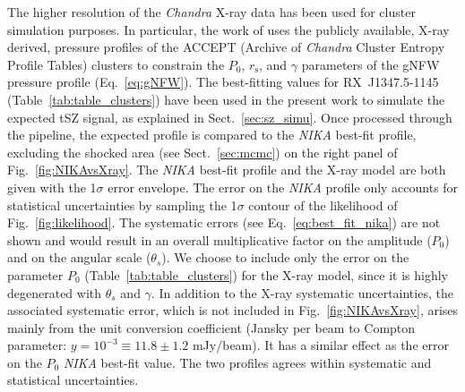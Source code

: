 The higher resolution of the {\it Chandra} \mbox{X-ray} data has been used for cluster simulation purposes. In particular, the work of \cite{Barbara} uses the publicly available, \mbox{X-ray} derived, pressure profiles of the ACCEPT (Archive of {\it Chandra} Cluster Entropy Profile Tables) clusters \citep{Cavagnolo2009} to constrain the $P_0 $, $r_{\mathrm{s}}$, and $\gamma$ parameters of the gNFW pressure profile (Eq.~\ref{eq:gNFW}). The best-fitting values for \mbox{RX~J1347.5-1145} (Table~\ref{tab:table_clusters}) have been used in the present work to simulate the expected tSZ signal, as explained in Sect.~\ref{sec:sz_simu}. Once processed through the pipeline, the expected profile is compared to the {\it NIKA} best-fit profile, excluding the shocked area (see Sect.~\ref{sec:mcmc}) on the right panel of Fig.~\ref{fig:NIKAvsXray}. The {\it NIKA} best-fit profile and the \mbox{X-ray} model are both given with the 1$\sigma$ error envelope. The error on the {\it NIKA} profile only accounts for statistical uncertainties by sampling the 1$\sigma$ contour of the likelihood of Fig.~\ref{fig:likelihood}. The systematic errors (see Eq.~\ref{eq:best_fit_nika}) are not shown and would result in an overall multiplicative factor on the amplitude ($P_0$) and on the angular scale ($\theta_s$). We choose to include only the error on the parameter $P_0$ (Table~\ref{tab:table_clusters}) for the \mbox{X-ray} model, since it is highly degenerated with $\theta_s$ and $\gamma$. In addition to the \mbox{X-ray} systematic uncertainties, the associated systematic error, which is not included in Fig.~\ref{fig:NIKAvsXray}, arises mainly from the unit conversion coefficient (Jansky per beam to Compton parameter: $y=10^{-3} \equiv 11.8 \pm 1.2$ mJy/beam). It has a similar effect as the error on the $P_0$ {\it NIKA} best-fit value. The two profiles agrees within systematic and statistical uncertainties. 
